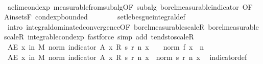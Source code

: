 \begin{isabellebody}
\ \ \ \ \ \ \isamarkupfalse%
\ ae{\isacharunderscore}{\kern0pt}lim{\isacharunderscore}{\kern0pt}cond{\isacharunderscore}{\kern0pt}exp\ measurable{\isacharunderscore}{\kern0pt}from{\isacharunderscore}{\kern0pt}subalg{\isacharbrackleft}{\kern0pt}OF\ subalg\ borel{\isacharunderscore}{\kern0pt}measurable{\isacharunderscore}{\kern0pt}indicator{\isacharcomma}{\kern0pt}\ OF\ A{\isacharunderscore}{\kern0pt}in{\isacharunderscore}{\kern0pt}sets{\isacharunderscore}{\kern0pt}F{\isacharbrackright}{\kern0pt}\ cond{\isacharunderscore}{\kern0pt}exp{\isacharunderscore}{\kern0pt}bounded\isanewline
\ \ \ \ \ \ \isamarkupfalse%
\ set{\isacharunderscore}{\kern0pt}lebesgue{\isacharunderscore}{\kern0pt}integral{\isacharunderscore}{\kern0pt}def\isanewline
\ \ \ \ \ \ \isamarkupfalse%
\ {\isacharparenleft}{\kern0pt}intro\ integral{\isacharunderscore}{\kern0pt}dominated{\isacharunderscore}{\kern0pt}convergence{\isacharbrackleft}{\kern0pt}OF\ borel{\isacharunderscore}{\kern0pt}measurable{\isacharunderscore}{\kern0pt}scaleR\ borel{\isacharunderscore}{\kern0pt}measurable{\isacharunderscore}{\kern0pt}scaleR\ integrable{\isacharunderscore}{\kern0pt}cond{\isacharunderscore}{\kern0pt}exp{\isacharbrackright}{\kern0pt}{\isacharparenright}{\kern0pt}\ {\isacharparenleft}{\kern0pt}fastforce\ simp\ add{\isacharcolon}{\kern0pt}\ tendsto{\isacharunderscore}{\kern0pt}scaleR{\isacharparenright}{\kern0pt}{\isacharplus}{\kern0pt}\isanewline
\isanewline
\ \ \ \ \isamarkupfalse%
\ {\isachardoublequoteopen}AE\ x\ in\ M{\isachardot}{\kern0pt}\ norm\ {\isacharparenleft}{\kern0pt}indicator\ A\ x\ {\isacharasterisk}{\kern0pt}\isactrlsub R\ s\ {\isacharparenleft}{\kern0pt}r\ n{\isacharparenright}{\kern0pt}\ x{\isacharparenright}{\kern0pt}\ {\isasymle}\ {}\ {\isacharasterisk}{\kern0pt}\ norm\ {\isacharparenleft}{\kern0pt}f\ x{\isacharparenright}{\kern0pt}{\isachardoublequoteclose}\ \ n\isanewline
\ \ \ \ \isamarkupfalse%
\ {\isacharminus}{\kern0pt}\isanewline
\ \ \ \ \ \ \isamarkupfalse%
\ {\isachardoublequoteopen}AE\ x\ in\ M{\isachardot}{\kern0pt}\ norm\ {\isacharparenleft}{\kern0pt}indicator\ A\ x\ {\isacharasterisk}{\kern0pt}\isactrlsub R\ s\ {\isacharparenleft}{\kern0pt}r\ n{\isacharparenright}{\kern0pt}\ x{\isacharparenright}{\kern0pt}\ {\isasymle}\ norm\ {\isacharparenleft}{\kern0pt}s\ {\isacharparenleft}{\kern0pt}r\ n{\isacharparenright}{\kern0pt}\ x{\isacharparenright}{\kern0pt}{\isachardoublequoteclose}\ \isamarkupfalse%
\ indicator{\isacharunderscore}{\kern0pt}def\ \isamarkupfalse%

\end{isabellebody}
